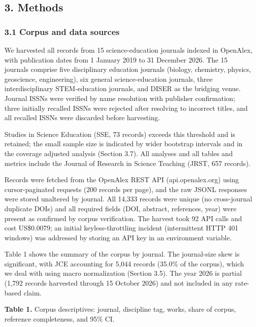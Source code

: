 \documentclass[pdflatex,sn-apa]{sn-jnl}
\begin{document}
\subsection{3. Methods}\label{methods}

\subsubsection{3.1 Corpus and data
sources}\label{corpus-and-data-sources}

We harvested all records from 15 science-education journals indexed in
OpenAlex, with publication dates from 1 January 2019 to 31 December
2026. The 15 journals comprise five disciplinary education journals
(biology, chemistry, physics, geoscience, engineering), six general
science-education journals, three interdisciplinary STEM-education
journals, and DISER as the bridging venue. Journal ISSNs were verified
by name resolution with publisher confirmation; three initially recalled
ISSNs were rejected after resolving to incorrect titles, and all
recalled ISSNs were discarded before harvesting.

Studies in Science Education (SSE, 73 records) exceeds this threshold
and is retained; the small sample size is indicated by wider bootstrap
intervals and in the coverage adjusted analysis (Section 3.7). All
analyses and all tables and metrics include the Journal of Research in
Science Teaching (JRST, 657 records).

Records were fetched from the OpenAlex REST API (api.openalex.org) using
cursor-paginated requests (200 records per page), and the raw JSONL
responses were stored unaltered by journal. All 14,333 records were
unique (no cross-journal duplicate DOIs) and all required fields (DOI,
abstract, references, year) were present as confirmed by corpus
verification. The harvest took 92 API calls and cost US\$0.0079; an
initial keyless-throttling incident (intermittent HTTP 401 windows) was
addressed by storing an API key in an environment variable.

Table 1 shows the summary of the corpus by journal. The journal-size
skew is significant, with JCE accounting for 5,044 records (35.0\% of
the corpus), which we deal with using macro normalization (Section 3.5).
The year 2026 is partial (1,792 records harvested through 15 October
2026) and not included in any rate-based claim.

\textbf{Table 1.} Corpus descriptives: journal, discipline tag, works,
share of corpus, reference completeness, and 95\% CI.
\end{document}
